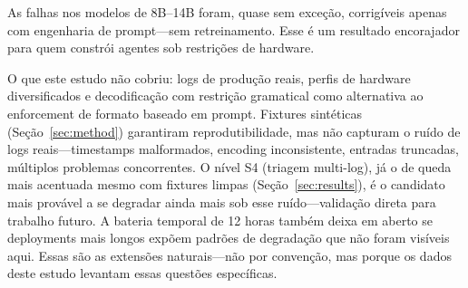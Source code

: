 \documentclass{kdmile}
\begin{document}
As falhas nos modelos de 8B--14B foram, quase sem exceção, corrigíveis apenas
com engenharia de prompt—\allowbreak sem retreinamento.
Esse é um resultado encorajador para quem constrói agentes sob restrições de
hardware.

O que este estudo não cobriu: logs de produção reais, perfis de hardware
diversificados e decodificação com restrição gramatical como alternativa ao
enforcement de formato baseado em prompt.
Fixtures sintéticas (Seção~\ref{sec:method}) garantiram reprodutibilidade, mas
não capturam o ruído de logs reais—\allowbreak timestamps malformados, encoding
inconsistente, entradas truncadas, múltiplos problemas concorrentes. O nível S4
(triagem multi-log), já o de queda mais acentuada mesmo com fixtures limpas
(Seção~\ref{sec:results}), é o candidato mais provável a se degradar ainda mais
sob esse ruído—\allowbreak validação direta para trabalho futuro.
A bateria temporal de 12 horas também deixa em aberto se deployments mais longos
expõem padrões de degradação que não foram visíveis aqui.
Essas são as extensões naturais—\allowbreak não por convenção, mas porque os dados deste
estudo levantam essas questões específicas.



\end{document}
